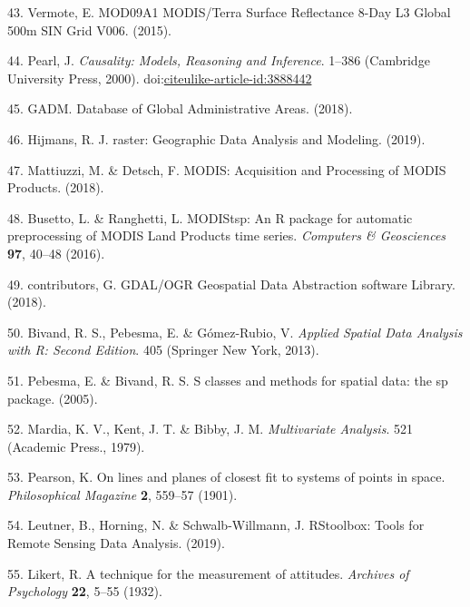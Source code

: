 \documentclass[12pt,oneside]{article}
\begin{document}
\leavevmode\hypertarget{ref-Vermote_2015}{}%
43. Vermote, E. MOD09A1 MODIS/Terra Surface Reflectance 8-Day L3 Global 500m SIN Grid V006. (2015).

\leavevmode\hypertarget{ref-Pearl_2000}{}%
44. Pearl, J. \emph{Causality: Models, Reasoning and Inference}. 1--386 (Cambridge University Press, 2000). doi:\href{https://doi.org/citeulike-article-id:3888442}{citeulike-article-id:3888442}

\leavevmode\hypertarget{ref-GADM_2018}{}%
45. GADM. Database of Global Administrative Areas. (2018).

\leavevmode\hypertarget{ref-Hijmans_2019}{}%
46. Hijmans, R. J. raster: Geographic Data Analysis and Modeling. (2019).

\leavevmode\hypertarget{ref-Mattiuzzi_and_Detsch_2018}{}%
47. Mattiuzzi, M. \& Detsch, F. MODIS: Acquisition and Processing of MODIS Products. (2018).

\leavevmode\hypertarget{ref-Busetto_and_ranghetti_2016}{}%
48. Busetto, L. \& Ranghetti, L. MODIStsp: An R package for automatic preprocessing of MODIS Land Products time series. \emph{Computers \& Geosciences} \textbf{97}, 40--48 (2016).

\leavevmode\hypertarget{ref-GDAL_OGRcontributors_2018}{}%
49. contributors, G. GDAL/OGR Geospatial Data Abstraction software Library. (2018).

\leavevmode\hypertarget{ref-Bivand_et_al_2013}{}%
50. Bivand, R. S., Pebesma, E. \& Gómez-Rubio, V. \emph{Applied Spatial Data Analysis with R: Second Edition}. 405 (Springer New York, 2013).

\leavevmode\hypertarget{ref-Pebesma_Bivand_2005}{}%
51. Pebesma, E. \& Bivand, R. S. S classes and methods for spatial data: the sp package. (2005).

\leavevmode\hypertarget{ref-Mardia_et_al_1979}{}%
52. Mardia, K. V., Kent, J. T. \& Bibby, J. M. \emph{Multivariate Analysis}. 521 (Academic Press., 1979).

\leavevmode\hypertarget{ref-Pearson_1901}{}%
53. Pearson, K. On lines and planes of closest fit to systems of points in space. \emph{Philosophical Magazine} \textbf{2}, 559--57 (1901).

\leavevmode\hypertarget{ref-Leutner_et_al_2019}{}%
54. Leutner, B., Horning, N. \& Schwalb-Willmann, J. RStoolbox: Tools for Remote Sensing Data Analysis. (2019).

\leavevmode\hypertarget{ref-Likert_1932}{}%
55. Likert, R. A technique for the measurement of attitudes. \emph{Archives of Psychology} \textbf{22}, 5--55 (1932).
\end{document}
